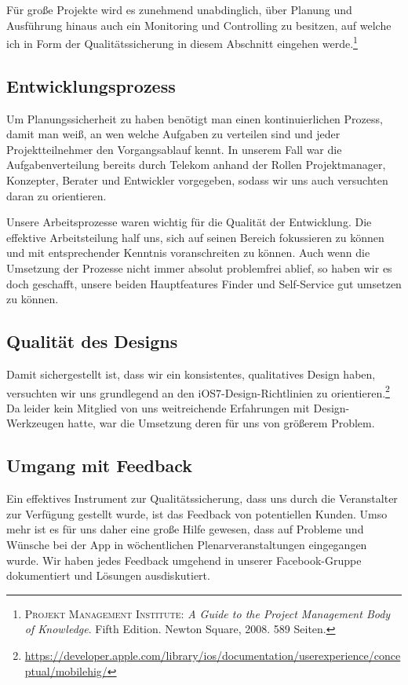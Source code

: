 	Für große Projekte wird es zunehmend unabdinglich, über Planung und Ausführung hinaus auch ein Monitoring und Controlling zu besitzen, auf welche ich in Form der Qualitätssicherung in diesem Abschnitt eingehen werde.\footnote{\textsc{Projekt Management Institute}: \textit{A Guide to the Project Management Body of Knowledge}. Fifth Edition. Newton Square, 2008. 589 Seiten.}

\subsection{Entwicklungsprozess}
	Um Planungssicherheit zu haben benötigt man einen kontinuierlichen Prozess, damit man weiß, an wen welche Aufgaben zu verteilen sind und jeder Projektteilnehmer den Vorgangsablauf kennt. In unserem Fall war die Aufgabenverteilung bereits durch Telekom anhand der Rollen Projektmanager, Konzepter, Berater und Entwickler vorgegeben, sodass wir uns auch versuchten daran zu orientieren. 
	
	Unsere Arbeitsprozesse waren wichtig für die Qualität der Entwicklung. Die effektive Arbeitsteilung half uns, sich auf seinen Bereich fokussieren zu können und mit entsprechender Kenntnis voranschreiten zu können. Auch wenn die Umsetzung der Prozesse nicht immer absolut problemfrei ablief, so haben wir es doch geschafft, unsere beiden Hauptfeatures Finder und Self-Service gut umsetzen zu können.

\subsection{Qualität des Designs}
	Damit sichergestellt ist, dass wir ein konsistentes, qualitatives Design haben, versuchten wir uns grundlegend an den iOS7-Design-Richtlinien zu orientieren.\footnote{\url{https://developer.apple.com/library/ios/documentation/userexperience/conceptual/mobilehig/}} Da leider kein Mitglied von uns weitreichende Erfahrungen mit Design-Werkzeugen hatte, war die Umsetzung deren für uns von größerem Problem.

\subsection{Umgang mit Feedback}
	Ein effektives Instrument zur Qualitätssicherung, dass uns durch die Veranstalter zur Verfügung gestellt wurde, ist das Feedback von potentiellen Kunden. Umso mehr ist es für uns daher eine große Hilfe gewesen, dass auf Probleme und Wünsche bei der App in wöchentlichen Plenarveranstaltungen eingegangen wurde. Wir haben jedes Feedback umgehend in unserer Facebook-Gruppe dokumentiert und Lösungen ausdiskutiert.
	
